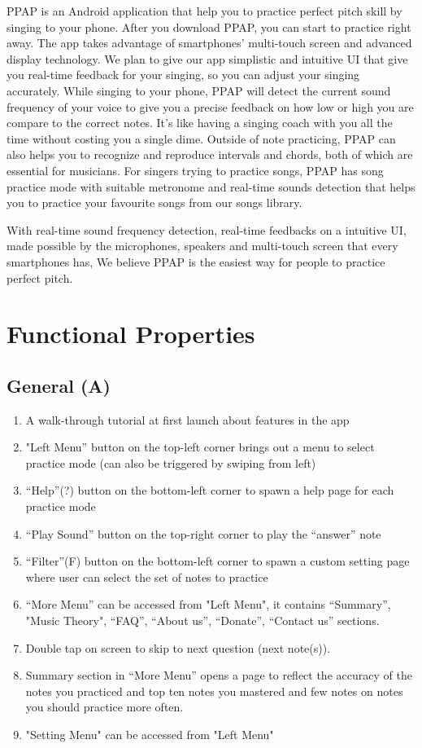 \documentclass{article}
\begin{document}
PPAP is an Android application that help you to practice perfect pitch skill by singing to your phone. After you download PPAP, you can start to practice right away. The app takes advantage of smartphones’ multi-touch screen and advanced display technology. We plan to give our app simplistic and intuitive UI that give you real-time feedback for your singing, so you can adjust your singing accurately. While singing to your phone, PPAP will detect the current sound frequency of your voice to give you a precise feedback on how low or high you are compare to the correct notes. It’s like having a singing coach with you all the time without costing you a single dime. Outside of note practicing, PPAP can also helps you to recognize and reproduce intervals and chords, both of which are essential for musicians. For singers trying to practice songs, PPAP has song practice mode with suitable metronome and real-time sounds detection that helps you to practice your favourite songs from our songs library.

With real-time sound frequency detection, real-time feedbacks on a intuitive UI, made possible by the microphones, speakers and multi-touch screen that every smartphones has, We believe PPAP is the easiest way for people to practice perfect pitch.

\newpage
\section{Functional Properties}
\subsection{General (A)}
\begin{enumerate}
  \item A walk-through tutorial at first launch about features in the app
  \item "Left Menu” button on the top-left corner brings out a menu to select practice mode (can also be triggered by swiping from left)
  \item “Help”(?) button on the bottom-left corner to spawn a help page for each practice mode
  \item “Play Sound” button on the top-right corner to play the “answer” note
  \item “Filter”(F) button on the bottom-left corner to spawn a custom setting page where user can select the set of notes to practice
  \item “More Menu” can be accessed from "Left Menu", it contains “Summary”, "Music Theory", “FAQ”, “About us”, “Donate”, “Contact us” sections.
  \item Double tap on screen to skip to next question (next note(s)).
  \item Summary section in “More Menu” opens a page to reflect the accuracy of the notes you practiced and top ten notes you mastered and few notes on notes you should practice more often. 
  \item "Setting Menu" can be accessed from "Left Menu" 
\end{enumerate}
\end{document}
